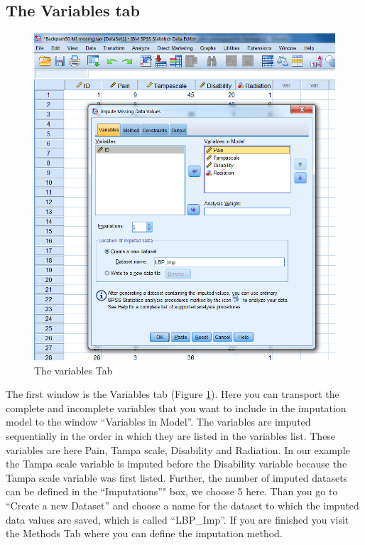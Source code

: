 \documentclass[
]{book}
\begin{document}
\hypertarget{the-variables-tab}{%
\subsection{The Variables tab}\label{the-variables-tab}}

\begin{figure}

{\centering \includegraphics[width=0.9\linewidth]{images/fig4.6} 

}

\caption{The variables Tab}\label{fig:fig4-6}
\end{figure}

The first window is the Variables tab (Figure \ref{fig:fig4-6}). Here you can transport the complete and incomplete variables that you want to include in the imputation model to the window ``Variables in Model''. The variables are imputed sequentially in the order in which they are listed in the variables list. These variables are here Pain, Tampa scale, Disability and Radiation. In our example the Tampa scale variable is imputed before the Disability variable because the Tampa scale variable was first listed. Further, the number of imputed datasets can be defined in the ``Imputations''" box, we choose 5 here. Than you go to ``Create a new Dataset'' and choose a name for the dataset to which the imputed data values are saved, which is called ``LBP\_Imp''. If you are finished you visit the Methods Tab where you can define the imputation method.
\end{document}
